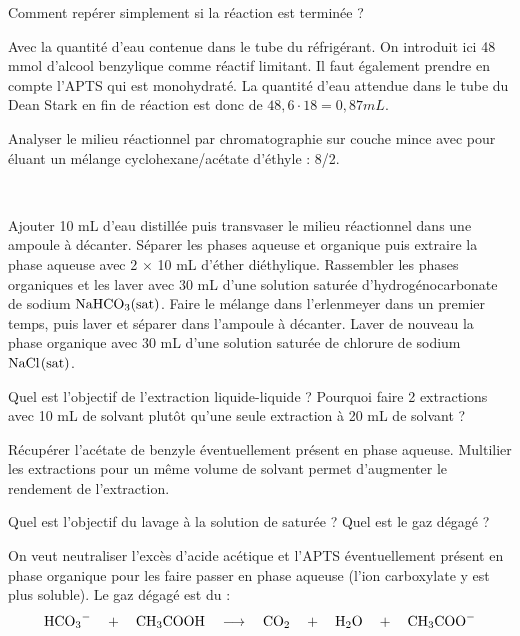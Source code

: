 \documentclass[twoside,a4paper,11pt,answers]{exam}
\begin{document}
\begin{questions}
\begin{framed}
\question Comment repérer simplement si la réaction est terminée ?
\begin{solution}[2cm]
Avec la quantité d'eau contenue dans le tube du réfrigérant. On introduit ici 48 mmol d'alcool benzylique comme réactif limitant. Il faut également prendre en compte l'APTS qui est monohydraté. La quantité d'eau attendue dans le tube du Dean Stark en fin de réaction est donc de $48,6 \cdot 18 = 0,87 mL$.

\end{solution}
\end{framed}

\par Analyser le milieu réactionnel par chromatographie sur couche mince avec pour éluant un mélange cyclohexane/acétate d’éthyle : 8/2.

~

\par Ajouter 10 mL d’eau distillée puis transvaser le milieu réactionnel dans une ampoule à décanter. Séparer les phases aqueuse et organique puis extraire la phase aqueuse avec 2 $\times$ 10 mL d’éther diéthylique. Rassembler les phases organiques et les laver avec 30 mL d'une solution saturée d’hydrogénocarbonate de sodium $\ce{NaHCO3(sat)}$. Faire le mélange dans l'erlenmeyer dans un premier temps, puis laver et séparer dans l'ampoule à décanter. Laver de nouveau la phase organique avec 30 mL d'une solution saturée de chlorure de sodium $\ce{NaCl(sat)}$.

\begin{framed}
\question Quel est l'objectif de l'extraction liquide-liquide ? Pourquoi faire 2 extractions avec 10 mL de solvant plutôt qu'une seule extraction à 20 mL de solvant ? 
\begin{solution}[2cm]
Récupérer l'acétate de benzyle éventuellement présent en phase aqueuse. Multilier les extractions pour un même volume de solvant permet d'augmenter le rendement de l'extraction.
\end{solution}
\end{framed}

\begin{framed}
\question Quel est l'objectif du lavage à la solution de  saturée ? Quel est le gaz dégagé ?
\begin{solution}[2cm]
On veut neutraliser l'excès d'acide acétique et l'APTS éventuellement présent en phase organique pour les faire passer en phase aqueuse (l'ion carboxylate y est plus soluble). Le gaz dégagé est du  : 
\begin{equation*}
    \ce{HCO3-} \quad + \quad \ce{CH3COOH} \quad \longrightarrow \quad \ce{CO2} \quad + \quad \ce{H2O} \quad + \quad \ce{CH3COO-}
\end{equation*}
\end{solution}
\end{framed}


\end{questions}
\end{document}
